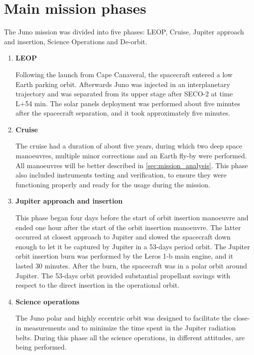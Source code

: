\section{Main mission phases}
\label{sec:phases}

The Juno mission was divided into five phases: LEOP, Cruise, Jupiter approach and insertion, Science Operations and De-orbit.
\begin{enumerate}
    \item \textbf{LEOP}
    
    Following the launch from Cape Canaveral, the spacecraft entered a low Earth parking orbit\cite{Juno_launch}.
     Afterwards Juno was injected in an interplanetary trajectory and was separated from its upper stage after SECO-2 at time L+54 min.
    The solar panels deployment was performed about five minutes after the spacecraft separation, and it took approximately five minutes.

    \item \textbf{Cruise}
    
    The cruise had a duration of about five years, during which two deep space manoeuvres, multiple minor corrections and an Earth fly-by were performed.
    All manoeuvres will be better described in \autoref{sec:mission_analysis}. This phase also included instruments testing and verification, to ensure they were functioning properly and ready for the usage during the mission. 

    \item \textbf{Jupiter approach and insertion}
    
    This phase began four days before the start of orbit insertion manoeuvre and ended one hour after the start of the orbit insertion manoeuvre. The latter occurred at closest approach to Jupiter and slowed the spacecraft down enough to let it be captured by Jupiter in a 53-days period orbit.
    The Jupiter orbit insertion burn was performed by the Leros 1-b main engine, and it lasted 30 minutes. After the burn, the spacecraft was in a polar orbit around Jupiter.
    The 53-days orbit provided substantial propellant savings with respect to the direct insertion in the operational orbit.

    \item \textbf{Science operations}
    
    The Juno polar and highly eccentric orbit was designed to facilitate the close-in measurements and to minimize the time spent in the Jupiter radiation belts. During this phase all the science operations, in different attitudes, are being performed.


\end{enumerate}
